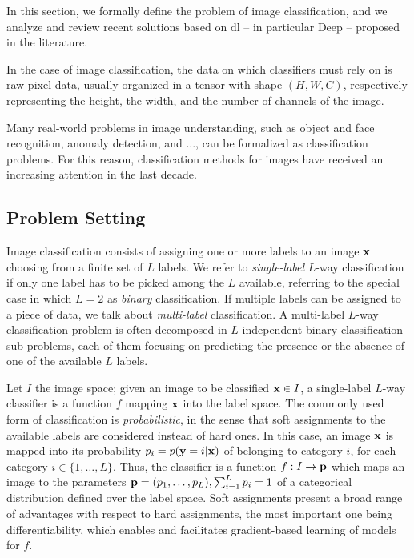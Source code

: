 In this section, we formally define the problem of image classification, and we analyze and review recent solutions based on \acrlong{dl} -- in particular Deep  -- proposed in the literature.

In the case of image classification, the data on which classifiers must rely on is raw pixel data, usually organized in a tensor with shape $(H, W, C)$, respectively representing the height, the width, and the number of channels of the image.

Many real-world problems in image understanding, such as object and face recognition, anomaly detection, and ..., can be formalized as classification problems.
For this reason, classification methods for images have received an increasing attention in the last decade.

\subsection{Problem Setting}
\label{subsec:back:classification}
Image classification consists of assigning one or more labels to an image $\mathbf{x}$ choosing from a finite set of $L$ labels.
We refer to \emph{single-label} $L$-way classification if only one label has to be picked among the $L$ available, referring to the special case in which $L=2$ as \emph{binary} classification.
If multiple labels can be assigned to a piece of data, we talk about \emph{multi-label} classification.
A multi-label $L$-way classification problem is often decomposed in $L$ independent binary classification sub-problems, each of them focusing on predicting the presence or the absence of one of the available $L$ labels.

Let $I$ the image space;
given an image to be classified $\mathbf{x} \in I$, a single-label $L$-way classifier is a function $f$ mapping $\mathbf{x}$ into the label space.
The commonly used form of classification is \emph{probabilistic}, in the sense that soft assignments to the available labels are considered instead of hard ones.
In this case, an image $\mathbf{x}$ is mapped into its probability $p_i = p(\mathbf{y} = i | \mathbf{x})$ of belonging to category $i$, for each category $i \in \{1, \dots, L\}$.
Thus, the classifier is a function $f: I \to \mathbf{p}$ which maps an image to the parameters $\mathbf{p} = (p_1, \ldots, p_L), \sum_{i=1}^L p_i = 1$ of a categorical distribution defined over the label space.
Soft assignments present a broad range of advantages with respect to hard assignments, the most important one being differentiability, which enables and facilitates gradient-based learning of models for $f$.


